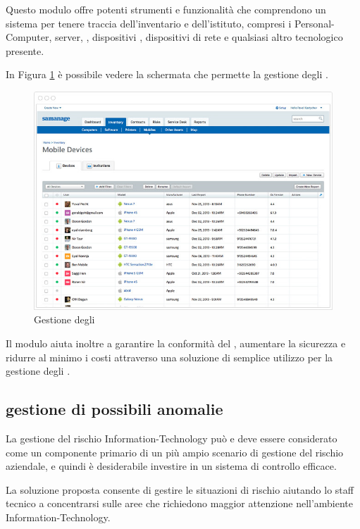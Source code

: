 Questo modulo offre potenti strumenti e funzionalità che comprendono un sistema per tenere traccia dell'inventario  e  dell'istituto, compresi i \acs{Personal-Computer}, server, , dispositivi , dispositivi di rete e qualsiasi altro  tecnologico presente.

In Figura \ref{sd-tools-asset-img} è possibile vedere la schermata che permette la gestione degli .

\begin{figure}[htbp]
\centering
\includegraphics[scale=0.6]{Images/samanage/Asset_management.png}
\caption{Gestione degli }
\label{sd-tools-asset-img}
\end{figure}

Il modulo aiuta inoltre a garantire la conformità del , aumentare la sicurezza e ridurre al minimo i costi attraverso una soluzione di semplice utilizzo per la gestione degli .

\subsection[Gestione di possibili anomalie]{gestione di possibili anomalie}
\label{sd-tools-risk}
La gestione del rischio \acs{Information-Technology} può e deve essere considerato come un componente primario di un più ampio scenario di gestione del rischio aziendale, e quindi è desiderabile investire in un sistema di controllo efficace.

La soluzione  proposta consente di gestire le situazioni di rischio aiutando lo staff tecnico a concentrarsi sulle aree che richiedono maggior attenzione nell'ambiente \acs{Information-Technology}.

